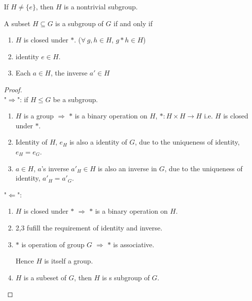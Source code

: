 \documentclass[11pt]{elegantbook}
\begin{document}
If $H\neq\{e\}$, then $H$ is a nontrivial subgroup.

\begin{theorem}
    A subset $H\subseteq G$ is a subgroup of $G$ if and only if
    \begin{enumerate}
        \item $H$ is closed under $*$. ($\forall\ g,h\in H$, $g*h\in H$)
        \item identity $e\in H$.
        \item Each $a\in H$, the inverse $a'\in H$
    \end{enumerate}
\end{theorem}
\begin{proof}
\quad\\
"$\Rightarrow$": if $H\leq G$ be a subgroup.
\begin{enumerate}
    \item $H$ is a group $\Rightarrow$ $*$ is a binary operation on $H$, $*:H\times H \rightarrow H$ i.e. $H$ is closed under $*$.
    \item Identity of $H$, $e_H$ is also a identity of $G$, due to the uniqueness of identity, $e_H=e_G$.
    \item $a\in H$, $a$'s inverse $a'_H\in H$ is also an inverse in $G$, due to the uniqueness of identity, $a'_H=a'_G$.
\end{enumerate}
"$\Leftarrow$":
\begin{enumerate}
    \item $H$ is closed under $*$ $\Rightarrow	$ $*$ is a binary operation on $H$.
    \item 2,3 fufill the requirement of identity and inverse.
    \item $*$ is operation of group $G$ $\Rightarrow$ $*$ is associative.
    
    Hence $H$ is itself a group.
    \item $H$ is a subeset of $G$, then $H$ is s subgroup of $G$.
\end{enumerate}
\end{proof}
\end{document}
